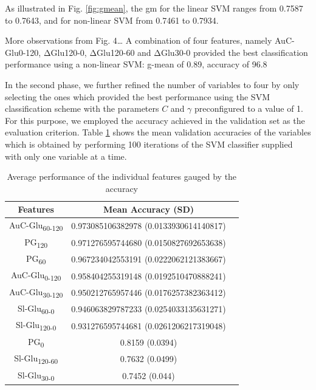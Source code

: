 \documentclass[journal,comsoc]{IEEEtran}
\renewcommand{\^}{\hat}  %
\begin{document}
As illustrated in Fig. \ref{fig:gmean}, the \ac{gm} for the linear SVM ranges from \num{0.7587} to \num{0.7643}, and for non-linear SVM from \num{0.7461} to \num{0.7934}.

 More observations from Fig. 4… A combination of four features, namely AuC-Glu0-120, ΔGlu120-0, ΔGlu120-60 and ΔGlu30-0 provided the best classification performance  using a non-linear SVM: g-mean of 0.89, accuracy of 96.8 %




In the second phase, we further refined the number of variables to four by only selecting the ones which provided the best performance using the SVM classification scheme with the parameters $C$ and $\gamma$ preconfigured to a value of \num{1}. For this purpose, we employed the accuracy achieved in the validation set as the evaluation criterion. Table \ref{tab:best_features} shows the mean validation accuracies of the variables which is  obtained by performing \num{100} iterations of the SVM classifier supplied with only one variable at a time.
\begin{table}[!htbp]
  \centering
  \renewcommand{\arraystretch}{1.3}
  \caption{Average performance of the individual features gauged by the accuracy}
  \centering
  \begin{tabular}{c c c}
    \toprule
    Features &  Mean Accuracy (SD)\\
    \midrule \midrule
    \rowcolor{green!25} AuC-Glu\textsubscript{60-120}	& \num{0.973085106382978}	(\num{0.0133930614140817})\\
    \rowcolor{green!25} PG\textsubscript{120}	& \num{0.971276595744680}	(\num{0.0150827692653638})\\
    \rowcolor{green!25} PG\textsubscript{60}	& \num{0.967234042553191}	(\num{0.0222062121383667})\\
    \rowcolor{green!25} AuC-Glu\textsubscript{0-120}	& \num{0.958404255319148}	(\num{0.0192510470888241})\\
    AuC-Glu\textsubscript{30-120}	& \num{0.950212765957446}	(\num{0.0176257382363412}) \\
    Sl-Glu\textsubscript{60-0}	& \num{0.946063829787233}	(\num{0.0254033135631271})\\
    Sl-Glu\textsubscript{120-0}	& \num{0.931276595744681}	(\num{0.0261206217319048})\\
    PG\textsubscript{0}	& \num{0.8159}	(\num{0.0394})\\
    Sl-Glu\textsubscript{120-60}	& \num{0.7632}	(\num{0.0499})\\
    Sl-Glu\textsubscript{30-0}	& \num{0.7452}	(\num{0.044})\\
    \bottomrule
  \end{tabular}
  \label{tab:best_features}
\end{table}
%
\end{document}

